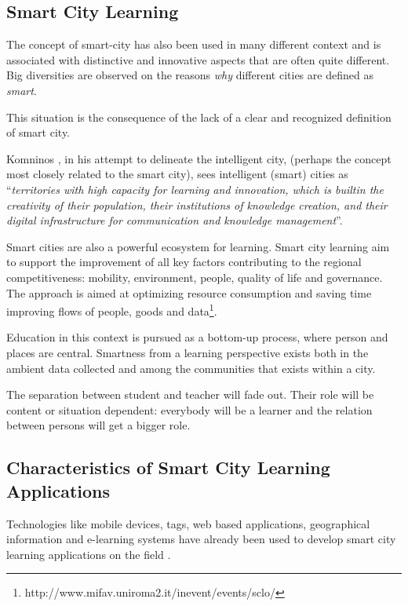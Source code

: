 \subsection{Smart City Learning}
The concept of smart-city has also been used in many different context and is associated with distinctive and innovative aspects that are often quite different. Big diversities are observed on the reasons \textit{why} different cities are defined as \textit{smart}.

This situation is the consequence of the lack of a clear and recognized definition of smart city.

Komninos \cite{komninos_intelligent_2002}, in his attempt to delineate the intelligent city, (perhaps the concept most closely related to the smart city), sees intelligent (smart) cities as ``\textit{territories with high capacity for learning and innovation, which is built\textendash in the creativity of their population, their institutions of knowledge creation, and their digital infrastructure for communication and knowledge management}''.

Smart cities are also a powerful ecosystem for learning. Smart city learning aim to support the improvement of all key factors contributing to the regional competitiveness: mobility, environment, people, quality of life and governance. The approach is aimed at optimizing resource consumption and saving time improving flows of people, goods and data\footnote{http://www.mifav.uniroma2.it/inevent/events/sclo/}.

Education in this context is pursued as a bottom-up process, where person and places are central. Smartness from a learning perspective exists both in the ambient data collected and among the communities that exists within a city.

The separation between student and teacher will fade out. Their role will be content or situation dependent: everybody will be a learner and the relation between persons will get a bigger role.


\subsection{Characteristics of Smart City Learning Applications}


Technologies like mobile devices, tags, web based applications, geographical information and e-learning systems have already been used to develop smart city learning applications on the field \cite{perez-sanagustin_multichannel_2013} \cite{delfatto_geographic_2013}.

